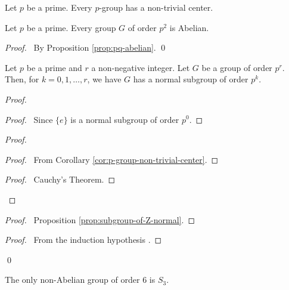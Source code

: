 \begin{cor}
\label{cor:p-group-non-trivial-center}
Let $p$ be a prime.
Every $p$-group has a non-trivial center.
\end{cor}

\begin{cor}
Let $p$ be a prime. Every group $G$ of order $p^2$ is Abelian.
\end{cor}

\begin{proof}
\pf\ By Proposition \ref{prop:pq-abelian}. \qed
\end{proof}

\begin{prop}
Let $p$ be a prime and $r$ a non-negative integer. Let $G$ be a group of order $p^r$. Then, for $k = 0, 1, \ldots, r$, we have $G$ has a normal subgroup of order $p^k$.
\end{prop}

\begin{proof}
\pf
{}
\begin{proof}
	\pf\ Since $\{e\}$ is a normal subgroup of order $p^0$.
\end{proof}
\begin{proof}
	\begin{proof}
		\pf\ From Corollary \ref{cor:p-group-non-trivial-center}.
	\end{proof}
	\begin{proof}
		\pf\ Cauchy's Theorem.
	\end{proof}
\end{proof}
\begin{proof}
	\pf\ Proposition \ref{prop:subgroup-of-Z-normal}.
\end{proof}
\begin{proof}
	\pf\ From the induction hypothesis .
\end{proof}
\qed
\end{proof}

\begin{ex}
The only non-Abelian group of order 6 is $S_3$.
\end{ex}

